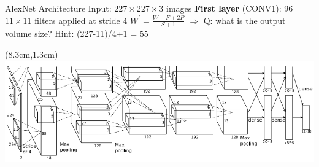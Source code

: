 \documentclass[serif, aspectratio=169]{beamer}
\begin{document}
\begin{frame}{AlexNet Architecture}
	\vspace{0.5cm}
	Input: $227 \times 227 \times 3$ images \vspace{0.3cm} \newline 
	\textbf{First layer} (CONV1): 96 $11 \times 11$ filters applied at stride 4 \hspace{2cm} $W^{\prime} = \frac{W - F + 2P}{S + 1}$ \newline
	$\Rightarrow$ \color{blue} Q: what is the output volume size? Hint: (227-11)/4+1 = 55
	
	\begin{textblock*}{5cm}(8.3cm,1.3cm) %
	\includegraphics[keepaspectratio, scale=0.25]{pic/alexnet}
	\end{textblock*}
\end{frame}
\end{document}
